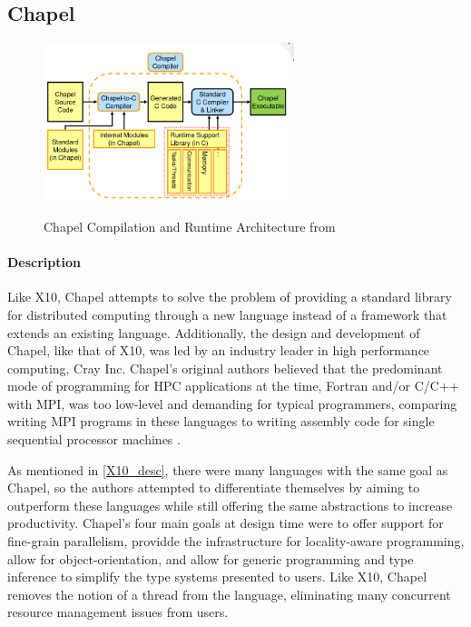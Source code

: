 \subsection{Chapel}
    \begin{figure}[h]
		\centering
		\includegraphics[width=0.65\textwidth]{Figures/chapel_arch.png}
        \label{fig:chapel_arch}
		\caption{Chapel Compilation and Runtime Architecture from \cite{chapel_rts_ppt}}
    \end{figure}
	\paragraph{Description}
	Like X10, Chapel attempts to solve the problem of providing a standard library for distributed computing through a new language instead of a framework that extends an existing language. Additionally, the design and development of Chapel, like that of X10, was led by an industry leader in high performance computing, Cray Inc. Chapel's original authors believed that the predominant mode of programming for HPC applications at the time, Fortran and/or C/C++ with MPI, was too low-level and demanding for typical programmers, comparing writing MPI programs in these languages to writing assembly code for single sequential processor machines \cite{chapel}.
	
	As mentioned in \ref{X10_desc}, there were many languages with the same goal as Chapel, so the authors attempted to differentiate themselves by aiming to outperform these languages while still offering the same abstractions to increase productivity. Chapel's four main goals at design time were to offer support for fine-grain parallelism, providde the infrastructure for locality-aware programming, allow for object-orientation, and allow for generic programming and type inference to simplify the type systems presented to users. Like X10, Chapel removes the notion of a thread from the language, eliminating many concurrent resource management issues from users. 

